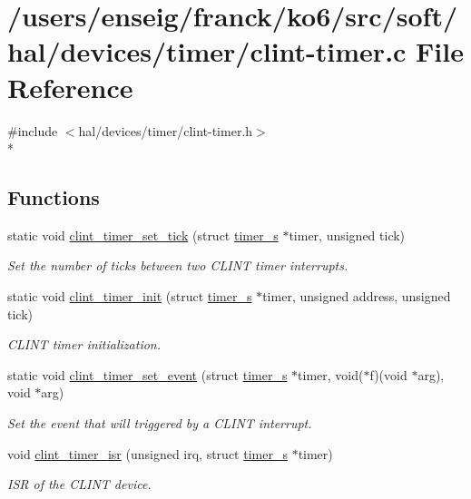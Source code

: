 \hypertarget{clint-timer_8c}{\section{/users/enseig/franck/ko6/src/soft/hal/devices/timer/clint-\/timer.c File Reference}
\label{clint-timer_8c}
}
{\ttfamily \#include $<$hal/devices/timer/clint-\/timer.\-h$>$}\\*
\subsection*{Functions}
\begin{DoxyCompactItemize}
\item 
static void \hyperlink{clint-timer_8c_ab787b81c06c064352fdba1152ef5efcb}{clint\-\_\-timer\-\_\-set\-\_\-tick} (struct \hyperlink{structtimer__s}{timer\-\_\-s} $\ast$timer, unsigned tick)
\begin{DoxyCompactList}\small\item\em Set the number of ticks between two C\-L\-I\-N\-T timer interrupts. \end{DoxyCompactList}\item 
static void \hyperlink{clint-timer_8c_ac30a676af29cbb246c9108869470323c}{clint\-\_\-timer\-\_\-init} (struct \hyperlink{structtimer__s}{timer\-\_\-s} $\ast$timer, unsigned address, unsigned tick)
\begin{DoxyCompactList}\small\item\em C\-L\-I\-N\-T timer initialization. \end{DoxyCompactList}\item 
static void \hyperlink{clint-timer_8c_a249a319ccbd6471ab60e1a40f1423321}{clint\-\_\-timer\-\_\-set\-\_\-event} (struct \hyperlink{structtimer__s}{timer\-\_\-s} $\ast$timer, void($\ast$f)(void $\ast$arg), void $\ast$arg)
\begin{DoxyCompactList}\small\item\em Set the event that will triggered by a C\-L\-I\-N\-T interrupt. \end{DoxyCompactList}\item 
void \hyperlink{clint-timer_8c_ac4e214b8457c4aa41856f050aa3144e5}{clint\-\_\-timer\-\_\-isr} (unsigned irq, struct \hyperlink{structtimer__s}{timer\-\_\-s} $\ast$timer)
\begin{DoxyCompactList}\small\item\em I\-S\-R of the C\-L\-I\-N\-T device. \end{DoxyCompactList}\end{DoxyCompactItemize}

